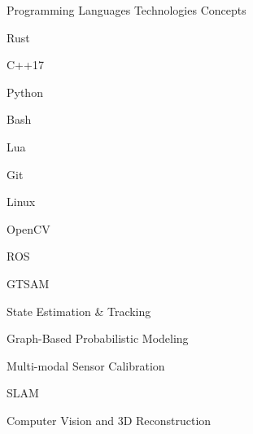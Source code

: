 
\begin{cventries}

  \cventrycol
  {Programming Languages}
  {Technologies}
  {Concepts}
  {
    \begin{cvitems}
      \item {Rust}
      \item {C++17}
      \item {Python}
      \item {Bash}
      \item {Lua}
    \end{cvitems}
  }
  {
    \begin{cvitems}
      \item {Git}
      \item {Linux}
      \item {OpenCV}
      \item {ROS}
      \item {GTSAM}
    \end{cvitems}
  }
  {
    \begin{cvitems}
      \item {State Estimation \& Tracking}
      \item {Graph-Based Probabilistic Modeling}
      \item {Multi-modal Sensor Calibration}
      \item {SLAM}
      \item {Computer Vision and 3D Reconstruction}
    \end{cvitems}
  }

\end{cventries}
